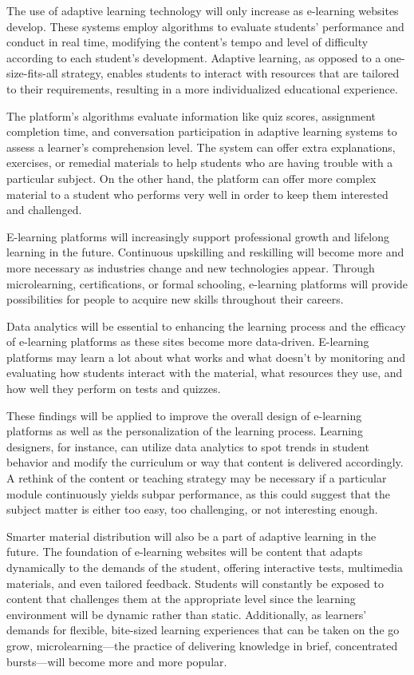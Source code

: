 \documentclass[BTech]{audiss}
\begin{document}
The use of adaptive learning technology will only increase as e-learning websites develop. These systems employ algorithms to evaluate students' performance and conduct in real time, modifying the content's tempo and level of difficulty according to each student's development. Adaptive learning, as opposed to a one-size-fits-all strategy, enables students to interact with resources that are tailored to their requirements, resulting in a more individualized educational experience.

The platform's algorithms evaluate information like quiz scores, assignment completion time, and conversation participation in adaptive learning systems to assess a learner's comprehension level. The system can offer extra explanations, exercises, or remedial materials to help students who are having trouble with a particular subject. On the other hand, the platform can offer more complex material to a student who performs very well in order to keep them interested and challenged.

E-learning platforms will increasingly support professional growth and lifelong learning in the future. Continuous upskilling and reskilling will become more and more necessary as industries change and new technologies appear. Through microlearning, certifications, or formal schooling, e-learning platforms will provide possibilities for people to acquire new skills throughout their careers.

Data analytics will be essential to enhancing the learning process and the efficacy of e-learning platforms as these sites become more data-driven. E-learning platforms may learn a lot about what works and what doesn't by monitoring and evaluating how students interact with the material, what resources they use, and how well they perform on tests and quizzes.

These findings will be applied to improve the overall design of e-learning platforms as well as the personalization of the learning process. Learning designers, for instance, can utilize data analytics to spot trends in student behavior and modify the curriculum or way that content is delivered accordingly. A rethink of the content or teaching strategy may be necessary if a particular module continuously yields subpar performance, as this could suggest that the subject matter is either too easy, too challenging, or not interesting enough.

Smarter material distribution will also be a part of adaptive learning in the future. The foundation of e-learning websites will be content that adapts dynamically to the demands of the student, offering interactive tests, multimedia materials, and even tailored feedback. Students will constantly be exposed to content that challenges them at the appropriate level since the learning environment will be dynamic rather than static. Additionally, as learners' demands for flexible, bite-sized learning experiences that can be taken on the go grow, microlearning---the practice of delivering knowledge in brief, concentrated bursts---will become more and more popular.
\newpage
\end{document}
